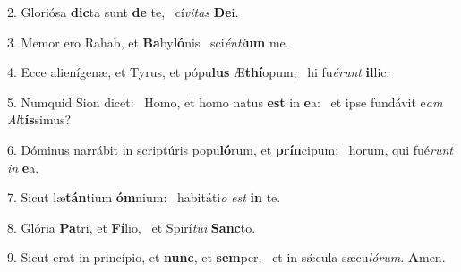 2. Gloriósa \textbf{dic}ta sunt \textbf{de} te, \ast\  cí\textit{vi}\textit{tas} \textbf{De}i.\

3. Memor ero Rahab, et \textbf{Ba}by\textbf{ló}nis \ast\  sci\textit{én}\textit{ti}\textbf{um} me.\

4. Ecce alienígenæ, et Tyrus, et pópu\textbf{lus} Æ\textbf{thí}opum, \ast\  hi fu\textit{é}\textit{runt} \textbf{il}lic.\

5. Numquid Sion dicet: \dag\  Homo, et homo natus \textbf{est} in \textbf{e}a: \ast\  et ipse fundávit e\textit{am} \textit{Al}\textbf{tís}simus?\

6. Dóminus narrábit in scriptúris popu\textbf{ló}rum, et \textbf{prín}cipum: \ast\  horum, qui fué\textit{runt} \textit{in} \textbf{e}a.\

7. Sicut læ\textbf{tán}tium \textbf{óm}nium: \ast\  habitáti\textit{o} \textit{est} \textbf{in} te.\

8. Glória \textbf{Pa}tri, et \textbf{Fí}lio, \ast\  et Spirí\textit{tu}\textit{i} \textbf{Sanc}to.\

9. Sicut erat in princípio, et \textbf{nunc}, et \textbf{sem}per, \ast\  et in sǽcula sæcu\textit{ló}\textit{rum}. \textbf{A}men.\

